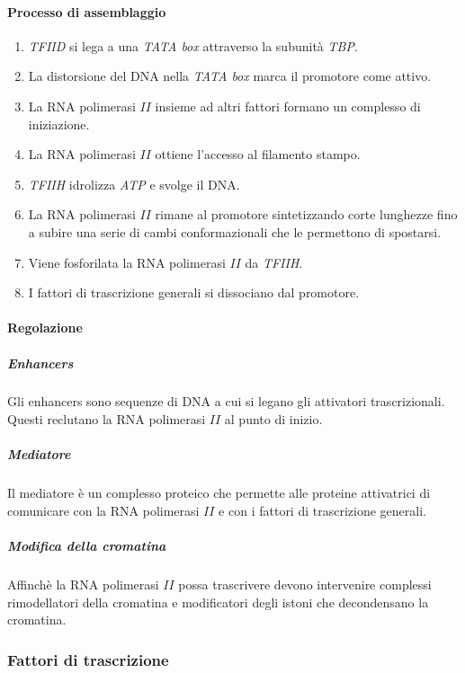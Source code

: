 			\paragraph{Processo di assemblaggio}
			\begin{multicols}{2}
				\begin{enumerate}
					\item \emph{TFIID} si lega a una \emph{TATA box} attraverso la subunit\`a \emph{TBP}.
					\item La distorsione del DNA nella \emph{TATA box} marca il promotore come attivo.
					\item La RNA polimerasi $II$ insieme ad altri fattori formano un complesso di iniziazione.
					\item La RNA polimerasi $II$ ottiene l'accesso al filamento stampo.
					\item \emph{TFIIH} idrolizza \emph{ATP} e svolge il DNA.
					\item La RNA polimerasi $II$ rimane al promotore sintetizzando corte lunghezze fino a subire una serie di cambi conformazionali che le permettono di spostarsi.
					\item Viene fosforilata la RNA polimerasi $II$  da \emph{TFIIH}.
					\item I fattori di trascrizione generali si dissociano dal promotore.
				\end{enumerate}
			\end{multicols}

			\paragraph{Regolazione}

				\subparagraph{Enhancers}
				Gli enhancers sono sequenze di DNA a cui si legano gli attivatori trascrizionali.
				Questi reclutano la RNA polimerasi $II$ al punto di inizio.

				\subparagraph{Mediatore}
				Il mediatore \`e un complesso proteico che permette alle proteine attivatrici di comunicare con la RNA polimerasi $II$ e con i fattori di trascrizione generali.

				\subparagraph{Modifica della cromatina}
				Affinch\`e la RNA polimerasi $II$ possa trascrivere devono intervenire complessi rimodellatori della cromatina e modificatori degli istoni che decondensano la cromatina.

		\subsubsection{Fattori di trascrizione}

